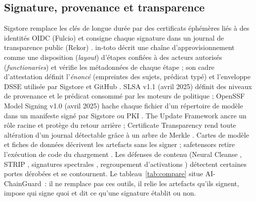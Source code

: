 \documentclass[conference]{IEEEtran}
\newcommand{\sys}{AI-ChainGuard}
\begin{document}
\subsection{Signature, provenance et transparence}
Sigstore remplace les clés de longue durée par des certificats éphémères liés à des identités OIDC (Fulcio) et consigne chaque signature dans un journal de transparence public (Rekor) \cite{sigstore2022}. in-toto décrit une chaîne d'approvisionnement comme une disposition (\emph{layout}) d'étapes confiées à des acteurs autorisés (\emph{functionaries}) et vérifie les métadonnées de chaque étape \cite{intoto2019} ; son cadre d'attestation définit l'\emph{énoncé} (empreintes des sujets, prédicat typé) et l'enveloppe DSSE utilisée par Sigstore et GitHub \cite{intotoattest,dsse}. SLSA v1.1 (avril 2025) définit des niveaux de provenance et le prédicat consommé par les moteurs de politique \cite{slsa11} ; OpenSSF Model Signing v1.0 (avril 2025) hache chaque fichier d'un répertoire de modèle dans un manifeste signé par Sigstore ou PKI \cite{oms2025}. The Update Framework ancre un rôle racine et protège du retour arrière \cite{tuf2010} ; Certificate Transparency rend toute altération d'un journal détectable grâce à un arbre de Merkle \cite{rfc6962}. Cartes de modèle \cite{modelcards} et fiches de données \cite{datasheets} décrivent les artefacts sans les signer ; safetensors retire l'exécution de code du chargement \cite{safetensors}. Les défenses de contenu (Neural Cleanse \cite{neuralcleanse}, STRIP \cite{strip}, signatures spectrales \cite{spectral}, regroupement d'activations \cite{activation}) détectent certaines portes dérobées et se contournent. Le tableau~\ref{tab:compare} situe \sys\ : il ne remplace pas ces outils, il relie les artefacts qu'ils signent, impose qui signe quoi et dit ce qu'une signature établit ou non.
\end{document}
